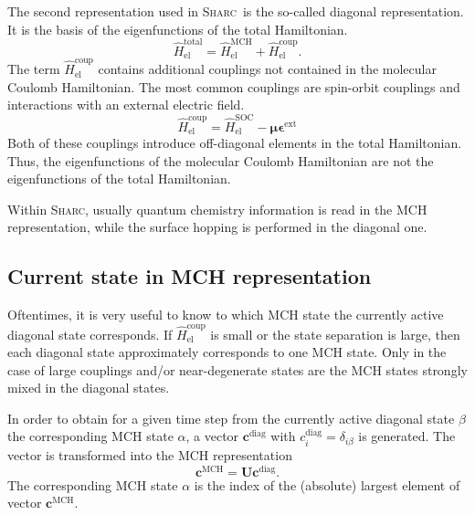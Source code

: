 \documentclass[a4paper,10pt,DIV=15,openany,twoside=false]{scrbook}
\newcommand{\sharc}{\textsc{Sharc}}
\newcommand{\VEC}[1]{\ensuremath{\mathbf{#1}}}
\begin{document}
The second representation used in \sharc\ is the so-called diagonal representation. It is the basis of the eigenfunctions of the total Hamiltonian.
\begin{equation}
  \hat{H}_{\text{el}}^{\text{total}}
  =\hat{H}_{\text{el}}^{\text{MCH}}
  +\hat{H}_{\text{el}}^{\text{coup}}.
\end{equation}
The term $\hat{H}_{\text{el}}^{\text{coup}}$ contains additional couplings not contained in the molecular Coulomb Hamiltonian. The most common couplings are spin-orbit couplings and interactions with an external electric field.
\begin{equation}
  \hat{H}_{\text{el}}^{\text{coup}}=\hat{H}_{\text{el}}^{\text{SOC}}-\boldsymbol{\mu}\boldsymbol{\epsilon}^{\text{ext}}
\end{equation}
Both of these couplings introduce off-diagonal elements in the total Hamiltonian. Thus, the eigenfunctions of the molecular Coulomb Hamiltonian are not the eigenfunctions of the total Hamiltonian. 

Within \sharc, usually quantum chemistry information is read in the MCH representation, while the surface hopping is performed in the diagonal one.

\subsection{Current state in MCH representation}\label{ssec:state_transform}

Oftentimes, it is very useful to know to which MCH state the currently active diagonal state corresponds. If $\hat{H}_{\text{el}}^{\text{coup}}$ is small or the state separation is large, then each diagonal state approximately corresponds to one MCH state. Only in the case of large couplings and/or near-degenerate states are the MCH states strongly mixed in the diagonal states.

In order to obtain for a given time step from the currently active diagonal state $\beta$ the corresponding MCH state $\alpha$, a vector $\VEC{c}^\text{diag}$ with $c_i^\text{diag}=\delta_{i\beta}$ is generated. The vector is transformed into the MCH representation
\begin{equation}
  \VEC{c}^\text{MCH}=\VEC{U}\VEC{c}^\text{diag}.
\end{equation}
The corresponding MCH state $\alpha$ is the index of the (absolute) largest element of vector $\VEC{c}^\text{MCH}$.

\end{document}
